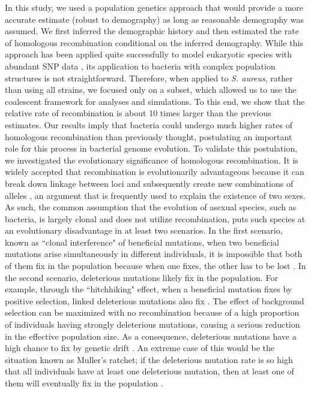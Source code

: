 \documentclass[twoside,twocolumn, letterpaper]{article}
\begin{document}
 In this study, we used a population genetics approach that would provide a more accurate estimate (robust to demography) as long as reasonable demography was assumed. We first inferred the demographic history and then estimated the rate of homologous recombination 
 conditional on the inferred demography. While this approach has been applied quite successfully to model eukaryotic species with abundant SNP data \cite[]{Haddrill_2005_15930491,Plagnol_2006_16299388}, its application to bacteria with complex population 
 structures is not straightforward. Therefore, when applied to \emph{S. aureus}, rather than using all strains, we focused only on a subset,
 which allowed us to use the coalescent framework for analyses and simulations. 
 To this end, we show that the relative rate of recombination is about 10 times larger than the previous estimates. Our results imply  
 that bacteria could undergo much higher rates of homologous recombination than previously thought, postulating an important role 
 for this process in bacterial genome evolution. To validate this postulation, we investigated the  evolutionary significance of 
 homologous recombination. 
 It is widely accepted that recombination is evolutionarily advantageous because it can break down linkage between loci and subsequently create new combinations of alleles \cite[]{Felsenstein_1974_4448362, MaynardSmith78:book, Kondrashov_1993_8409359, Barton_1998_9748151, Otto_2002_11967550}, an argument that is frequently used to explain the existence of two sexes. As such, the common assumption that the evolution of asexual species, such as bacteria, is largely clonal and does not utilize recombination, puts such species at an evolutionary disadvantage in at least two scenarios. In the first scenario, known as ``clonal interference" of beneficial mutations, when two beneficial mutations arise simultaneously in different individuals, it is impossible that both of them fix in the population because when one fixes, the other has to be lost \cite[]{Fisher30:book, Muller_1932_62, Hill_1966_37, Gerrish_1998_9720276}. In the second scenario, deleterious mutations likely fix in the population. For example, through the ``hitchhiking" effect, when a beneficial mutation fixes by positive selection, linked deleterious mutations also fix \cite[]{Kojima_1967_4, Maynard_Smith_1974_5}. The effect of background selection can be maximized with no recombination because of a high proportion of individuals having strongly deleterious mutations, causing a serious reduction in the effective population size. As a consequence, deleterious mutations have a high chance to fix by genetic drift \cite[]{Charlesworth_1993_8375663}. An extreme case of this would be the situation known as Muller's ratchet; if the deleterious mutation rate is so high that all individuals have at least one deleterious mutation, then at least one of them will eventually fix in the population \cite[]{Muller_1932_62, Muller_1964_31}. 
\end{document}
